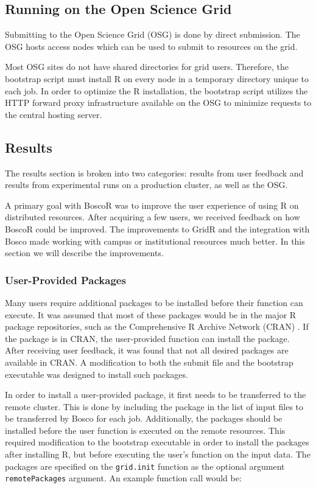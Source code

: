\subsection{Running on the Open Science Grid}

Submitting to the Open Science Grid (OSG) is done by direct submission.  The OSG hosts access nodes which can be used to submit to resources on the grid.

Most OSG sites do not have shared directories for grid users.  Therefore, the bootstrap script must install R on every node in a temporary directory unique to each job.  In order to optimize the R installation, the bootstrap script utilizes the HTTP forward proxy infrastructure \cite{garzoglio2012supporting} available on the OSG to minimize requests to the central hosting server.


\subsection{Results}
\label{sec:boscorresults}

The results section is broken into two categories: results from user feedback and results from experimental runs on a production cluster, as well as the OSG.

A primary goal with BoscoR was to improve the user experience of using R on distributed resources. After acquiring a few users, we received feedback on how BoscoR could be improved.  The improvements to GridR and the integration with Bosco made working with campus or institutional resources much better.  In this section we will describe the improvements.

\subsubsection{User-Provided Packages}

Many users require additional packages to be installed before their function can execute.  It was assumed that most of these packages would be in the major R package repositories, such as the Comprehensive R Archive Network (CRAN) \cite{cran}.  If the package is in CRAN, the user-provided function can install the package.  After receiving user feedback, it was found that not all desired packages are available in CRAN.  A modification to both the submit file and the bootstrap executable was designed to install such packages.

In order to install a user-provided package, it first needs to be transferred to the remote cluster.  This is done by including the package in the list of input files to be transferred by Bosco for each job.  Additionally, the packages should be installed before the user function is executed on the remote resources.  This required modification to the bootstrap executable in order to install the packages after installing R, but before executing the user's function on the input data.  The packages are specified on the \texttt{grid.init} function as the optional argument \texttt{remotePackages} argument.  An example function call would be:


